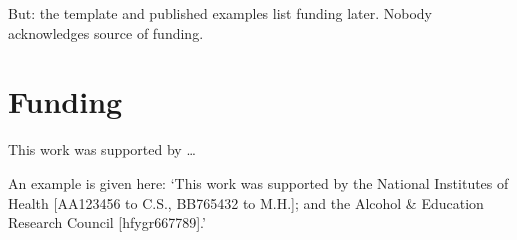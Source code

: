 \documentclass{bioinfo}
\begin{document}
But: the template and published examples list funding later.
Nobody acknowledges source of funding.
\vspace*{-12pt}



\section*{Funding}

This work was supported by \dots

An example is given here: ‘This work was supported by the National Institutes of Health [AA123456 to C.S., BB765432 to M.H.]; and the Alcohol \& Education Research Council [hfygr667789].’
\vspace*{-12pt}





\end{document}
